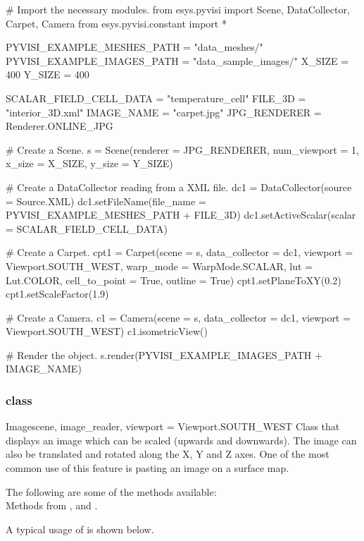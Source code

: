 \begin{python}
# Import the necessary modules.
from esys.pyvisi import Scene, DataCollector, Carpet, Camera
from esys.pyvisi.constant import *

PYVISI_EXAMPLE_MESHES_PATH = "data_meshes/"
PYVISI_EXAMPLE_IMAGES_PATH = "data_sample_images/"
X_SIZE = 400
Y_SIZE = 400

SCALAR_FIELD_CELL_DATA = "temperature_cell"
FILE_3D = "interior_3D.xml"
IMAGE_NAME = "carpet.jpg"
JPG_RENDERER = Renderer.ONLINE_JPG

# Create a Scene.
s = Scene(renderer = JPG_RENDERER, num_viewport = 1, x_size = X_SIZE, 
        y_size = Y_SIZE)

# Create a DataCollector reading from a XML file.
dc1 = DataCollector(source = Source.XML)
dc1.setFileName(file_name = PYVISI_EXAMPLE_MESHES_PATH + FILE_3D)
dc1.setActiveScalar(scalar = SCALAR_FIELD_CELL_DATA)

# Create a Carpet.
cpt1 = Carpet(scene = s, data_collector = dc1, viewport = Viewport.SOUTH_WEST, 
        warp_mode = WarpMode.SCALAR, lut = Lut.COLOR, cell_to_point = True,
        outline = True)
cpt1.setPlaneToXY(0.2)
cpt1.setScaleFactor(1.9)

# Create a Camera.
c1 = Camera(scene = s, data_collector = dc1, viewport = Viewport.SOUTH_WEST)
c1.isometricView()

# Render the object.
s.render(PYVISI_EXAMPLE_IMAGES_PATH + IMAGE_NAME)
\end{python}

\subsubsection{\Image class}

\begin{classdesc}{Image}{scene, image_reader, viewport = Viewport.SOUTH_WEST}
Class that displays an image which can be scaled (upwards and downwards). The 
image can also be translated and rotated along the X, Y and Z axes. One of 
the most common use of this feature is pasting an image on a surface map.
\end{classdesc}

The following are some of the methods available:\\
Methods from \ActorThreeD, \PlaneSource and \Transform.

A typical usage of \Image is shown below.


